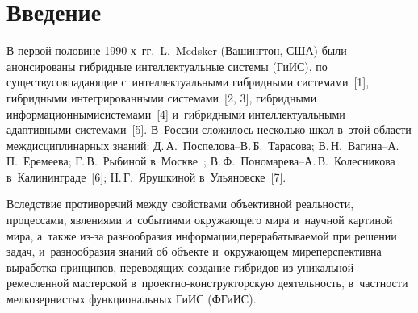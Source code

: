 

\vspace*{-4pt}



\thispagestyle{headings}

\begin{multicols}{2}

\label{st\stat}

\section{Введение}

  В первой половине 1990-х~гг.\ L.~Medsker (Вашингтон, США) были анонсированы 
гибридные интеллектуальные сис\-те\-мы (ГиИС), по существу\linebreak совпадающие 
с~интеллектуальными гибридными сис\-те\-ма\-ми~[1], гибридными интегрированными 
сис\-те\-ма\-ми~[2, 3], гибридными информационными\linebreak сис\-те\-ма\-ми~[4] и~гибридными 
интеллектуальными адап\-тив\-ны\-ми сис\-те\-ма\-ми~[5]. В~России сложилось несколько школ 
в~этой области междисциплинарных знаний: Д.\,А.~Пос\-пе\-ло\-ва--В.\,Б.~Та\-ра\-со\-ва; 
В.\,Н.~Ва\-ги\-на--А.\,П.~Ере\-ме\-ева; Г.\,В.~Рыбиной в~Москве~\cite{3-kir};  
В.\,Ф.~По\-но\-ма\-ре\-ва--А.\,В.~Ко\-лес\-ни\-ко\-ва в~Калининграде~[6]; Н.\,Г.~Ярушкиной 
в~Ульяновске~[7].
{

} 
  
  Вследствие противоречий между свойствами объективной реальности, процессами, 
явлениями и~событиями окружающего мира и~научной карти\-ной мира, а~так\-же из-за 
разнообразия информации,\linebreak перерабатываемой при решении задач, и~разнообразия знаний об 
объекте и~окружающем мире\linebreak перспективна выработка принципов, переводящих создание 
гибридов из уникальной ре\-мес\-лен\-ной мастерской в~про\-ект\-но-кон\-струк\-тор\-скую 
деятельность, в~частности мелкозернистых функциональных ГиИС (ФГиИС). 


\end{multicols}
